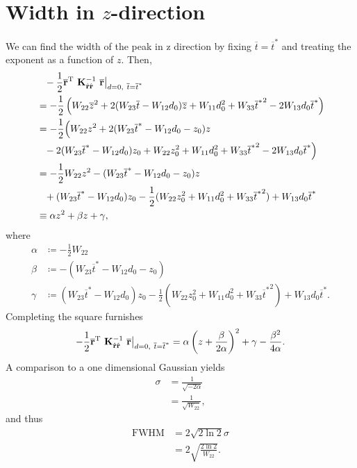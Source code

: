 \documentclass[12pt,a4paper]{scrarticle}
\begin{document}
\section{Width in $z$-direction}
We can find the width of the peak in z direction by fixing $\overline{t} = \overline{t}^*$ and treating the exponent as a function of $z$. Then,
\begin{align*}
\label{eq:target}
    &\hphantom{=} -\frac{1}{2} \ipCoordShifted^{\transpose} \ \CovMat{\ip}^{-1} \ \ipCoordShifted \big|_{d = 0,\ \overline{t} = \overline{t}^*} \\
    &= -\frac{1}{2} \left(W_{22} \overline{z}^2  + 2 (W_{23} \overline{t} - W_{12} d_0) \overline{z} + W_{11} d_0^2 + W_{33} {\overline{t}^*}^2 - 2 W_{13} d_0 \overline{t}^* \right) \\
    &= -\frac{1}{2} \Big(W_{22} z^2  + 2 (W_{23} \overline{t}^* - W_{12} d_0 - z_0) z \\ 
    &\hphantom{=} - 2 (W_{23} \overline{t}^* - W_{12} d_0) z_0 + W_{22} z_0^2 + W_{11} d_0^2 + W_{33} {\overline{t}^*}^2 - 2 W_{13} d_0 \overline{t}^* \Big) \\
    &= -\frac{1}{2} W_{22} z^2 - (W_{23} \overline{t}^* - W_{12} d_0 - z_0) z \\ 
    &\hphantom{=} + (W_{23} \overline{t}^* - W_{12} d_0) z_0 -\frac{1}{2} (W_{22} z_0^2 + W_{11} d_0^2 + W_{33} {\overline{t}^*}^2) + W_{13} d_0 \overline{t}^* \\
    &\equiv \alpha  z^2 + \beta z + \gamma,
\end{align*}
where \begin{align*}
    \alpha &\coloneqq -\frac{1}{2} W_{22} \\
    \beta &\coloneqq - (W_{23} \overline{t}^* - W_{12} d_0 - z_0) \\
    \gamma &\coloneqq (W_{23} \overline{t}^* - W_{12} d_0) z_0 -\frac{1}{2} (W_{22} z_0^2 + W_{11} d_0^2 + W_{33} {\overline{t}^*}^2) + W_{13} d_0 \overline{t}^*.
\end{align*}
%
Completing the square furnishes 
\begin{align*}
    -\frac{1}{2} \ipCoordShifted^{\transpose} \ \CovMat{\ip}^{-1} \ \ipCoordShifted \big|_{d = 0,\ \overline{t} = \overline{t}^*} = \alpha \left( z + \frac{\beta}{2 \alpha}\right)^2 + \gamma -\frac{\beta^2}{4 \alpha}.
\end{align*}
%
A comparison to a one dimensional Gaussian yields
\begin{align*}
    \sigma 
    &= \frac{1}{\sqrt{- 2 \alpha}} \\
    &= \frac{1}{\sqrt{W_{22}}},
\end{align*}
and thus \cite{fwhm}
\begin{align*}
    \text{FWHM}
    &= 2 \sqrt{2 \ln{2}} \sigma \\
    &=  2 \sqrt{\frac{2 \ln{2}}{W_{22}}}. 
\end{align*}

\printbibliography{}
\end{document}
